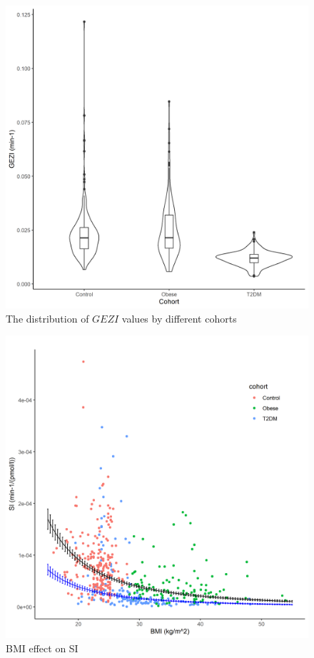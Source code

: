 \documentclass[utf8]{frontiersSCNS} %
\begin{document}
\begin{figure}[h!]
\begin{center}
\includegraphics[width=15cm]{SG_co.PNG}
\end{center}
\caption{The distribution of $GEZI$ values by different cohorts}
\label{fig: SG_co}
\end{figure}

\begin{figure}[h!]
\begin{center}
\includegraphics[width=15cm]{SI_BMI.PNG}
\end{center}
\caption{BMI effect on SI}
\label{fig: SI_BMI}
\end{figure}
\end{document}
